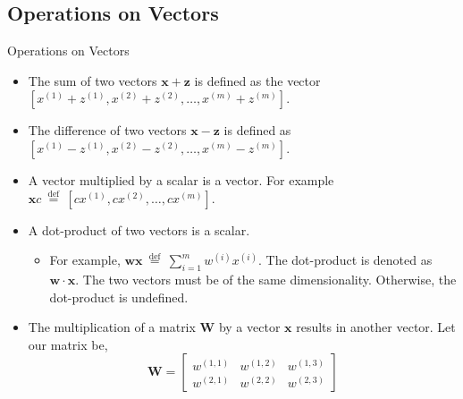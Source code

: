 \documentclass[9pt,dvipsnames]{beamer}
\begin{document}
\subsection{Operations on Vectors}
\begin{frame}{Operations on Vectors}
	\begin{itemize}
		\item The sum of two vectors $\mathbf{x}+\mathbf{z}$ is defined as the vector $\left[x^{(1)}+z^{(1)}, x^{(2)}+z^{(2)}, \ldots, x^{(m)}+z^{(m)}\right]$.
		\item The difference of two vectors $\mathbf{x}-\mathbf{z}$ is defined as $\left[x^{(1)}-z^{(1)}, x^{(2)}-z^{(2)}, \ldots, x^{(m)}-z^{(m)}\right]$.
		\item A vector multiplied by a scalar is a vector. For example $\mathbf{x} c \stackrel{\text { def }}{=}\left[c x^{(1)}, c x^{(2)}, \ldots, c x^{(m)}\right]$.
		\item A dot-product of two vectors is a scalar.
		      \begin{itemize}
			      \item For example, $\mathbf{w} \mathbf{x} \stackrel{\text { def }}{=} \sum_{i=1}^{m} w^{(i)} x^{(i)}$. The dot-product is denoted as $\mathbf{w} \cdot \mathbf{x}$. The two vectors must be of the same dimensionality. Otherwise, the dot-product is undefined.
		      \end{itemize}
		\item The multiplication of a matrix $\mathbf{W}$ by a vector $\mathbf{x}$ results in another vector. Let our matrix be,
		      $$
			      \mathbf{W}=\left[\begin{array}{lll}
					      w^{(1,1)} & w^{(1,2)} & w^{(1,3)} \\
					      w^{(2,1)} & w^{(2,2)} & w^{(2,3)}
				      \end{array}\right]
		      $$
	\end{itemize}
\end{frame}
\end{document}
